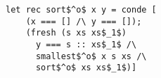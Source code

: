 \begin{figure}[h]
  \centering
  \begin{minipage}{0.87\columnwidth}
    \begin{lstlisting}[frame=tb]
 let rec sort$^o$ x y = conde [
    (x === [] /\ y === []);
    (fresh (s xs xs$_1$)
      y === s :: xs$_1$ /\
      smallest$^o$ x s xs /\
      sort$^o$ xs xs$_1$)]
    \end{lstlisting}
  \end{minipage}
\end{figure}
